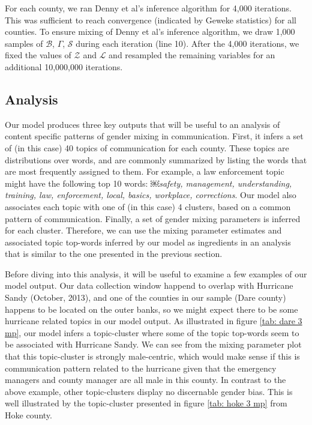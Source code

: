 \documentclass{pnastwo}
\begin{document}
\begin{article}
For each county, we ran Denny et al's inference algorithm for 4,000
iterations. This was sufficient to reach convergence (indicated by
Geweke statistics) for all counties. To ensure mixing of Denny et al's
inference algorithm, we draw 1,000 samples of $\mathcal{B}$, $\Gamma$,
$\mathcal{S}$ during each iteration (line 10). After the 4,000
iterations, we fixed the values of $\mathcal{Z}$ and $\mathcal{L}$ and
resampled the remaining variables for an additional 10,000,000
iterations.

\subsection{Analysis}
Our model produces three key outputs that will be useful to an analysis of content specific patterns of gender mixing in communication. First, it infers a set of (in this case) 40 topics of communication for each county. These topics are distributions over words, and are commonly summarized by listing the words that are most frequently assigned to them. For example, a law enforcement topic might have the following top 10 words:
￼\emph{safety, management, understanding, training, law, enforcement, local, basics, workplace, corrections}. Our model also associates each topic with one of (in this case) 4 clusters, based on a common pattern of communication. Finally, a set of gender mixing parameters is inferred for each cluster. Therefore, we can use the mixing parameter estimates and associated topic top-words inferred by our model as ingredients in an analysis that is similar to the one presented in the previous section.

Before diving into this analysis, it will be useful to examine a few examples of our model output. Our data collection window happend to overlap with Hurricane Sandy (October, 2013), and one of the counties in our sample (Dare county) happens to be located on the outer banks, so we might expect there to be some hurricane related topics in our model output. As illustrated in figure \ref{tab: dare 3 mp}, our model infers a topic-cluster where some of the topic top-words seem to be associated with Hurricane Sandy. We can see from the mixing parameter plot that this topic-cluster is strongly male-centric, which would make sense if this is communication pattern related to the hurricane given that the emergency managers and county manager are all male in this county. In contrast to the above example, other topic-clusters display no discernable gender bias. This is well illustrated by the topic-cluster presented in figure \ref{tab: hoke 3 mp} from Hoke county.


\end{article}
\end{document}
